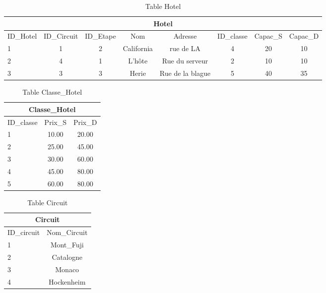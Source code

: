 
\begin{table}[h]
\begin{center}
\begin{tabular}{|l|c|c|c|c|c|c|c|}
\hline
\multicolumn{8}{|c|}{Hotel}\\
\hline
ID\_Hotel& ID\_Circuit& ID\_Etape &Nom & Adresse &ID\_classe & Capac\_S & Capac\_D \\
\hline
1 & 1& 2& California&rue de LA& 4 & 20 & 10\\
\hline
2 & 4& 1&L'h\^ote&Rue du serveur& 2 & 10 & 10\\
\hline
3 & 3& 3& Herie&Rue de la blague& 5 & 40 & 35\\
\hline
\end{tabular}
\end{center}
\caption{Table Hotel}
\end{table}


\begin{table}[h]
\begin{center}
\begin{tabular}{|l|c|c|}
\hline
\multicolumn{3}{|c|}{Classe\_Hotel}\\
\hline
ID\_classe& Prix\_S & Prix\_D \\
\hline
1 & 10.00& 20.00\\
\hline
2 & 25.00& 45.00\\
\hline
3 & 30.00& 60.00\\
\hline
4 &  45.00& 80.00\\
\hline
5 & 60.00& 80.00\\
\hline
\end{tabular}
\end{center}
\caption{Table Classe\_Hotel}
\end{table}


\begin{table}[h]
\begin{center}
\begin{tabular}{|l|c|}
\hline
\multicolumn{2}{|c|}{Circuit}\\
\hline
ID\_circuit& Nom\_Circuit \\
\hline
1 & Mont\_Fuji\\
\hline
2 & Catalogne\\
\hline
3 & Monaco\\
\hline
4 &  Hockenheim\\
\hline
\end{tabular}
\end{center}
\caption{Table Circuit}
\end{table}
\newpage

